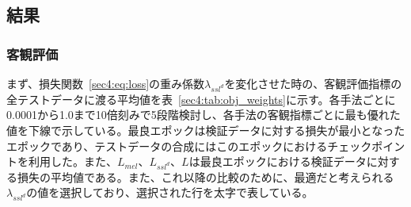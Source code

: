 \documentclass[12pt]{jarticle}
\numberwithin{equation}{section}    %
\numberwithin{figure}{section}      %
\numberwithin{table}{section}      %
\begin{document}

\subsection{結果}
\subsubsection{客観評価}
まず、損失関数~\eqref{sec4:eq:loss}の重み係数$\lambda_{ssl^{d}}$を変化させた時の、客観評価指標の全テストデータに渡る平均値を表~\ref{sec4:tab:obj_weights}に示す。各手法ごとに0.0001から1.0まで10倍刻みで5段階検討し、各手法の客観指標ごとに最も優れた値を下線で示している。最良エポックは検証データに対する損失が最小となったエポックであり、テストデータの合成にはこのエポックにおけるチェックポイントを利用した。また、$L_{mel}$、$L_{ssl^{d}}$、$L$は最良エポックにおける検証データに対する損失の平均値である。また、これ以降の比較のために、最適だと考えられる$\lambda_{ssl^{d}}$の値を選択しており、選択された行を太字で表している。
\end{document}
